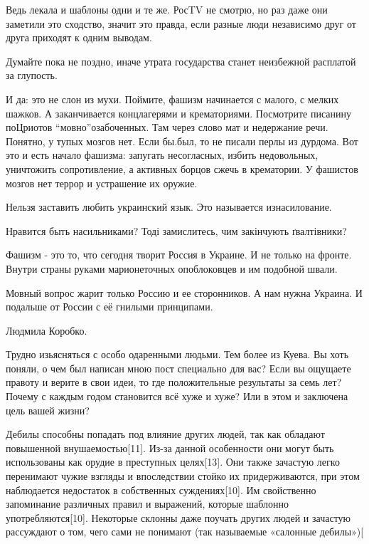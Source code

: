 \begin{itemize}
{\begin{itemize}
Ведь лекала и шаблоны одни и те же. РосTV не смотрю, но раз даже они заметили
это сходство, значит это правда, если разные люди независимо друг от друга
приходят к одним выводам.

Думайте пока не поздно, иначе утрата государства станет неизбежной расплатой за глупость.

И да: это не слон из мухи. Поймите, фашизм начинается с малого, с мелких
шажков. А заканчивается концлагерями и крематориями. Посмотрите писанину
поЦриотов \enquote{мовно}озабоченных. Там через слово мат и недержание речи. Понятно, у
тупых мозгов нет. Если бы.был, то не писали перлы из дурдома. Вот это и есть
начало фашизма: запугать несогласных, избить недовольных, уничтожить
сопротивление, а активных борцов сжечь в крематории. У фашистов мозгов нет
террор и устрашение их оружие.


Нельзя заставить любить украинский язык. Это называется изнасилование.

Нравится быть насильниками? Тоді замислитесь, чим закінчують ґвалтівники?



Фашизм - это то, что сегодня творит Россия в Украине. И не только на фронте.
Внутри страны руками марионеточных опоблоковцев и им подобной швали.

Мовный вопрос жарит только Россию и ее сторонников. А нам нужна Украина. И
подальше от России с её гнилыми принципами.

Людмила Коробко.

Трудно изьясняться с особо одаренными людьми. Тем более из Куева. Вы хоть
поняли, о чем был написан мною пост специально для вас? Если вы ощущаете
правоту и верите в свои идеи, то где положительные результаты за семь лет?
Почему с каждым годом становится всё хуже и хуже? Или в этом и заключена цель
вашей жизни?

Дебилы способны попадать под влияние других людей, так как обладают повышенной
внушаемостью[11]. Из-за данной особенности они могут быть использованы как
орудие в преступных целях[13]. Они также зачастую легко перенимают чужие
взгляды и впоследствии стойко их придерживаются, при этом наблюдается
недостаток в собственных суждениях[10]. Им свойственно запоминание различных
правил и выражений, которые шаблонно употребляются[10]. Некоторые склонны даже
поучать других людей и зачастую рассуждают о том, чего сами не понимают (так
называемые «салонные дебилы»)[



\end{itemize}}
\end{itemize}
